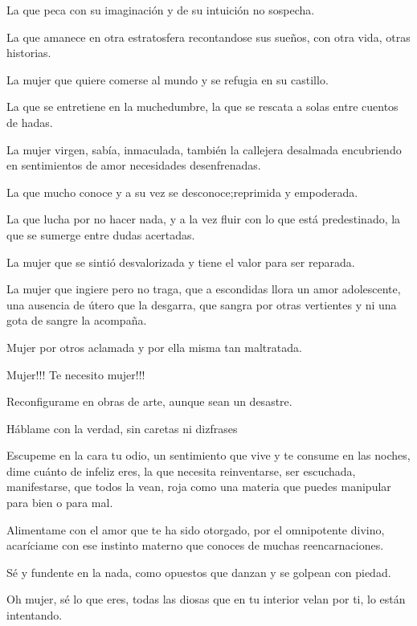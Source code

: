 \documentclass[12pt, a4paper, twoside]{book} %
\begin{document}
La que peca con su imaginación y de su intuición no sospecha.

La que amanece en otra estratosfera recontandose sus sueños, con otra vida, otras historias.

La mujer que quiere comerse al mundo y se refugia en su castillo.

La que se entretiene en la muchedumbre, la que se rescata a solas entre cuentos de hadas.

La mujer virgen, sabía, inmaculada, también la callejera desalmada encubriendo en sentimientos de amor necesidades desenfrenadas.

La que mucho conoce y a su vez se desconoce;reprimida y empoderada.

La que lucha por no hacer nada, y a la vez fluir con lo que está predestinado, la que se sumerge entre dudas acertadas.

La mujer que se sintió desvalorizada y tiene el valor para ser reparada.

La mujer que ingiere pero no traga, que a escondidas llora un amor adolescente, una ausencia de útero que la desgarra, que sangra por otras vertientes y ni una gota de sangre la acompaña.

Mujer por otros aclamada y por ella misma tan maltratada.

Mujer!!! Te necesito mujer!!!

Reconfigurame en obras de arte, aunque sean un desastre.

Háblame con la verdad, sin caretas ni dizfrases

Escupeme en la cara tu odio, un sentimiento que vive y te consume en las noches, dime cuánto de infeliz eres, la que necesita reinventarse, ser escuchada, manifestarse, que todos la vean, roja como una materia que puedes manipular para bien o para mal.

Alimentame con el amor que te ha sido otorgado, por el omnipotente divino, acaríciame con ese instinto materno que conoces de muchas reencarnaciones.

Sé y fundente en la nada, como opuestos que danzan y se golpean con piedad.

Oh mujer, sé lo que eres, todas las diosas que en tu interior velan por ti, lo están intentando.
\end{document}
